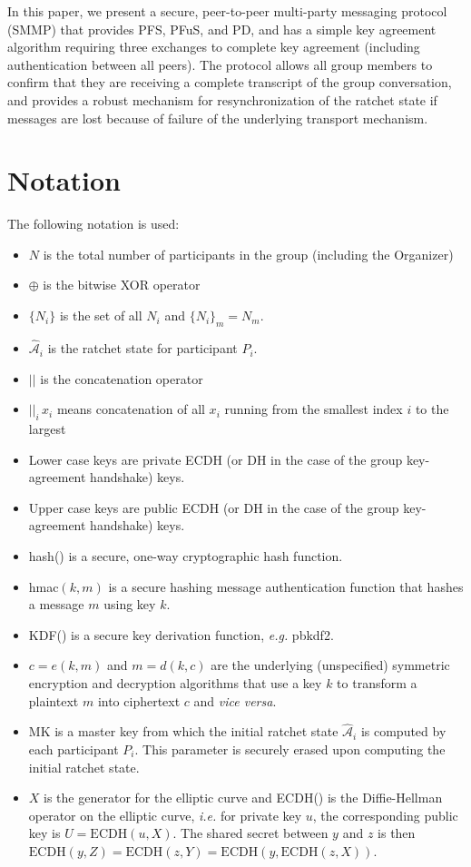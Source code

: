 \documentclass[%
preprint,
amsmath,amssymb,
aps,
prb,
floatfix,
]{revtex4-1}
\begin{document}
In this paper, we present a secure, peer-to-peer multi-party messaging protocol
(SMMP) that provides PFS, PFuS, and PD, and has a simple key agreement
algorithm requiring three exchanges to complete key agreement (including
authentication between all peers).
The protocol allows all group members to confirm that they are
receiving a complete transcript of the group conversation, and provides a
robust mechanism for resynchronization of the ratchet state if messages are lost
because of failure of the underlying transport mechanism.

\section{\label{sec:notation}Notation}
The following notation is used:
\begin{itemize}
\item $N$ is the total number of participants in the group (including the
Organizer)
\item $\oplus$ is the bitwise XOR operator
\item $\{N_i\}$ is the set of all $N_i$ and $\{N_i\}_m = N_m$.
\item $\mathcal{\hat{A}}_i$ is the ratchet state for
participant $P_i$.
\item $||$ is the concatenation operator
\item $||_i \, x_i$ means concatenation of all $x_i$ running from the smallest
index $i$ to the largest
\item Lower case keys are private ECDH (or DH in the case of the group
key-agreement handshake) keys.
\item Upper case keys are public ECDH (or DH in the case of the group
key-agreement handshake) keys.
\item hash() is a secure, one-way cryptographic hash function.
\item hmac$(k,m)$ is a secure hashing message authentication function that
hashes a message $m$ using key $k$.
\item KDF() is a secure key derivation function, \textit{e.g.} pbkdf2.
\item $c = e(k, m)$ and $m = d(k,c)$ are the underlying (unspecified) symmetric
encryption and decryption algorithms that use a key $k$ to transform a plaintext
$m$ into ciphertext $c$ and \textit{vice versa}.
\item MK is a master key from which the initial ratchet state
$\mathcal{\hat{A}}_i$ is computed by each participant $P_i$. This parameter is
securely erased upon computing the initial ratchet state.
\item $X$ is the generator for the elliptic curve and ECDH() is the Diffie-Hellman
operator on the elliptic curve, \textit{i.e.} for private key $u$, the
corresponding public key is $U = \mathrm{ECDH}(u, X)$. The shared secret between
$y$ and $z$ is then $ \mathrm{ECDH}(y,Z) = \mathrm{ECDH}(z,Y) =
\mathrm{ECDH}(y,\mathrm{ECDH}(z, X))$.
\end{itemize}
\end{document}
